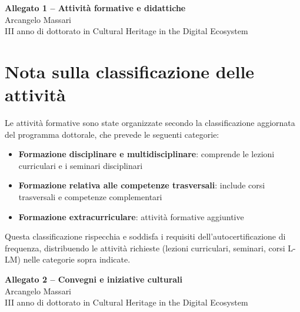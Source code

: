 \documentclass[11pt,a4paper]{article}
\begin{document}


\newpage
\begin{center}
{\Large \textbf{Allegato 1 -- Attività formative e didattiche}}\\[0.5cm]
{\large Arcangelo Massari}\\
{\large III anno di dottorato in Cultural Heritage in the Digital Ecosystem}
\end{center}

\section*{Nota sulla classificazione delle attività}

Le attività formative sono state organizzate secondo la classificazione aggiornata del programma dottorale, che prevede le seguenti categorie:
\begin{itemize}
    \item \textbf{Formazione disciplinare e multidisciplinare}: comprende le lezioni curriculari e i seminari disciplinari
    \item \textbf{Formazione relativa alle competenze trasversali}: include corsi trasversali e competenze complementari
    \item \textbf{Formazione extracurriculare}: attività formative aggiuntive
\end{itemize}

Questa classificazione rispecchia e soddisfa i requisiti dell'autocertificazione di frequenza, distribuendo le attività richieste (lezioni curriculari, seminari, corsi L-LM) nelle categorie sopra indicate.

\setcounter{section}{0}







\newpage
\begin{center}
{\Large \textbf{Allegato 2 -- Convegni e iniziative culturali}}\\[0.5cm]
{\large Arcangelo Massari}\\
{\large III anno di dottorato in Cultural Heritage in the Digital Ecosystem}
\end{center}

\setcounter{section}{0}

\end{document}
